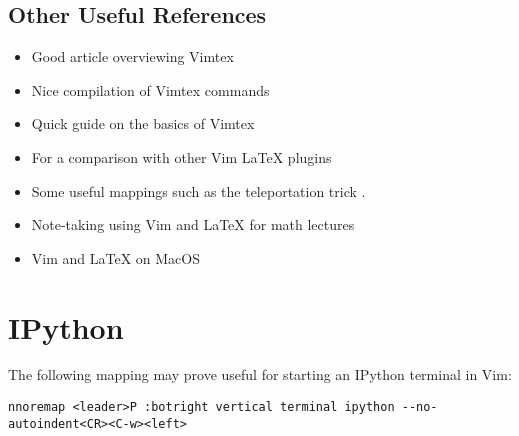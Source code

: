 \subsection{Other Useful References}
\begin{itemize}
    \item Good article overviewing Vimtex \cite{woodruff2019latex}
    \item Nice compilation of Vimtex commands \cite{gunther2014vimtex}
    \item Quick guide on the basics of Vimtex \cite{jdhao2019complete}
    \item For a comparison with other Vim LaTeX plugins \cite{lervag2015vim}
    \item Some useful mappings such as the teleportation trick
        \cite{smith2016my, smith2017start}.
    \item Note-taking using Vim and LaTeX for math lectures \cite{castel2019how}
    \item Vim and LaTeX on MacOS \cite{dyke2020getting}
\end{itemize}

\section{IPython}
The following mapping may prove useful for starting an IPython terminal in
Vim:\\
\begin{lstlisting}
nnoremap <leader>P :botright vertical terminal ipython --no-autoindent<CR><C-w><left>
\end{lstlisting}

